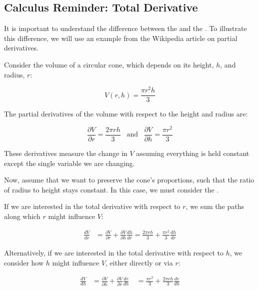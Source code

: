     \subsection{Calculus Reminder: Total Derivative}
    
    It is important to understand the difference between the  and the . To illustrate this difference, we will use an example from the Wikipedia article on partial derivatives.
    
    Consider the volume of a circular cone, which depends on its height, $h$, and radius, $r$:
    
    \begin{equation*}
    V(r, h) = \frac{\pi r^2 h}{3}
    \end{equation*}
    
    The partial derivatives of the volume with respect to the height and radius are:
    
    \begin{equation*}
    \frac{\partial V}{\partial r} = \frac{2\pi r h}{3}\;\;\;\text{and}\;\;\;
    \frac{\partial V}{\partial h} = \frac{\pi r^2}{3}
    \end{equation*}
    
    These derivatives measure the change in $V$ assuming everything is held constant except the single variable we are changing.
    
    Now, assume that we want to preserve the cone's proportions, such that the ratio of radius to height stays constant. In this case, we must consider the .
    
    If we are interested in the total derivative with respect to $r$, we sum the paths along which $r$ might influence $V$:
    
    \begin{align*}
    \frac{dV}{dr} & = \frac{\partial V}{\partial r} + \frac{\partial V}{\partial h} \frac{dh}{dr} 
     = \frac{2 \pi r h}{3} + \frac{\pi r^2}{3} \frac{dh}{dr}
    \end{align*}
    
    Alternatively, if we are interested in the total derivative with respect to $h$, we consider how $h$ might influence $V$, either directly or via $r$:
    
    \begin{align*}
    \frac{dV}{dh} & = \frac{\partial V}{\partial h} + \frac{\partial V}{\partial r} \frac{dr}{dh} \
    & = \frac{\pi r^2}{3} + \frac{2 \pi r h}{3} \frac{dr}{dh}
    \end{align*}
    
